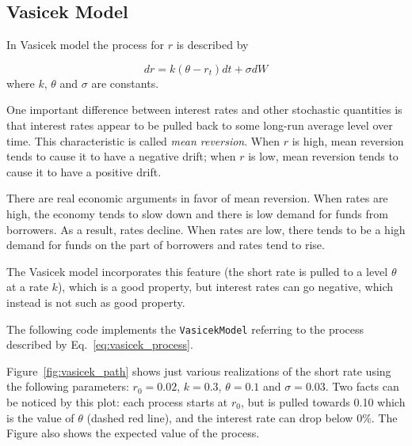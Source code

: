 \subsection{Vasicek Model}\label{vasicek-model}

In Vasicek model the process for $r$ is described by

\begin{equation}
dr = k(\theta - r_t)dt + \sigma dW
\label{eq:vasicek_process}
\end{equation}
where \(k\), \(\theta\) and \(\sigma\) are constants.

One important difference between interest rates and other stochastic quantities is that interest rates appear to be pulled back to some long-run average level over time. This characteristic is called \emph{mean reversion}. When $r$ is high, mean reversion tends to cause it to have a negative drift; when $r$ is low, mean reversion tends to cause it to have a positive drift.

There are real economic arguments in favor of mean reversion. When rates are high, the economy tends to slow down and there is low demand for funds from borrowers. As a result, rates decline. When rates are low, there tends to be a high demand for funds on the part of borrowers and rates tend to rise.

The Vasicek model incorporates this feature (the short rate is pulled to a level $\theta$ at a rate $k$), which is a good property, but interest rates can go negative, which instead is not such as good property.

\begin{finmarkets}
The following code implements the \texttt{VasicekModel} referring to the process described by Eq.~\ref{eq:vasicek_process}.
\end{finmarkets}


Figure~\ref{fig:vasicek_path} shows just various realizations of the short rate using the following parameters: $r_0=0.02$, $k=0.3$, $\theta=0.1$ and $\sigma=0.03$. 
Two facts can be noticed by this plot: each process starts at $r_0$, but is pulled towards 0.10 which is the value of $\theta$ (dashed red line), and the interest rate can drop below 0\%. The Figure also shows the expected value of the process.

